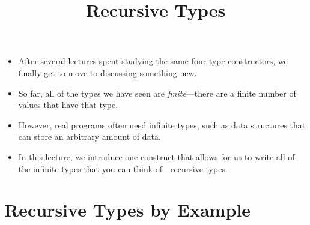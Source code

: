 \documentclass{lecturenotes}
\title{Recursive Types}
\begin{document}
\maketitle

\begin{itemize}
\item After several lectures spent studying the same four type constructors, we finally get to move to discussing something new.
\item So far, all of the types we have seen are \emph{finite}---there are a finite number of values that have that type.
\item However, real programs often need infinite types, such as data structures that can store an arbitrary amount of data.
\item In this lecture, we introduce one construct that allows for us to write all of the infinite types that you can think of---recursive types.
\end{itemize}

\section{Recursive Types by Example}
\label{sec:recurs-types-example}
\end{document}
